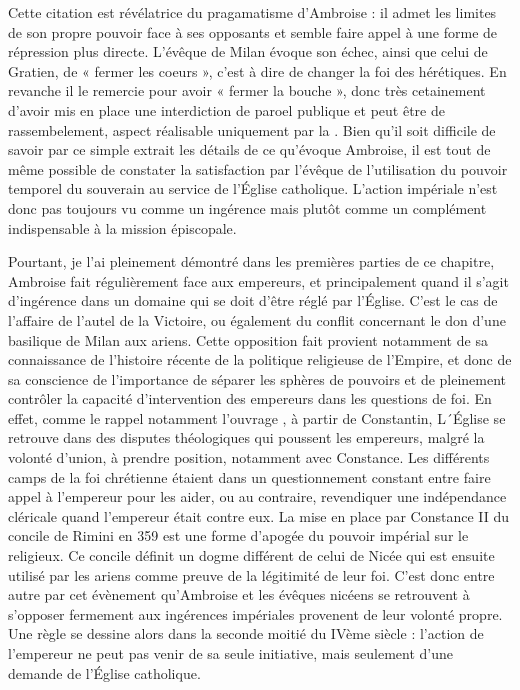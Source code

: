 Cette citation est révélatrice du pragamatisme d'Ambroise : il admet les limites de son propre pouvoir face à ses opposants et semble faire appel à une forme de répression plus directe. L'évêque de Milan évoque son échec, ainsi que celui de Gratien, de « fermer les coeurs », c'est à dire de changer la foi des hérétiques. En revanche il le remercie pour avoir « fermer la bouche », donc très cetainement d'avoir mis en place une interdiction de paroel publique et peut être de rassembelement, aspect réalisable uniquement par la . Bien qu'il soit difficile de savoir par ce simple extrait les détails de ce qu'évoque Ambroise, il est tout de même possible de constater la satisfaction par l'évêque de l'utilisation du pouvoir temporel du souverain au service de l'Église catholique. L'action impériale n'est donc pas toujours vu comme un ingérence mais plutôt comme un complément indispensable à la mission épiscopale.

\bigskip

Pourtant, je l'ai pleinement démontré dans les premières parties de ce chapitre, Ambroise fait régulièrement face aux empereurs, et principalement quand il s'agit d'ingérence dans un domaine qui se doit d'être réglé par l'Église. C'est le cas de l'affaire de l'autel de la Victoire, ou également du conflit concernant le don d'une basilique de Milan aux ariens. Cette opposition fait provient notamment de sa connaissance de l'histoire récente de la politique religieuse de l'Empire, et donc de sa conscience de l'importance de séparer les sphères de pouvoirs et de pleinement contrôler la capacité d'intervention des empereurs dans les questions de foi. En effet, comme le rappel notamment l'ouvrage , à partir de Constantin, L´Église se retrouve dans des disputes théologiques qui poussent les empereurs, malgré la volonté d’union, à prendre position, notamment avec Constance. Les différents camps de la foi chrétienne étaient dans un questionnement constant entre faire appel à l’empereur pour les aider, ou au contraire, revendiquer une indépendance cléricale quand l’empereur était contre eux\autocite[658]{rowe_history}. La mise en place par Constance II du concile de Rimini en 359 est une forme d'apogée du pouvoir impérial sur le religieux. Ce concile définit un dogme différent de celui de Nicée qui est ensuite utilisé par les ariens comme preuve de la légitimité de leur foi. C'est donc entre autre par cet évènement qu'Ambroise et les évêques nicéens se retrouvent à s'opposer fermement aux ingérences impériales provenent de leur volonté propre. Une règle se dessine alors dans la seconde moitié du IVème siècle : l'action de l'empereur ne peut pas venir de sa seule initiative, mais seulement d'une demande de l'Église catholique.

